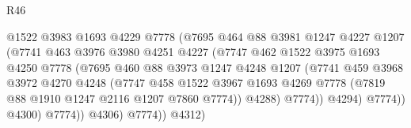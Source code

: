 \begin{lexlean}{R46}
\begin{coremodule}
                                    @1522
                                    @3983
                                    @1693
                                    @4229
                                    @7778
                                    (@7695
                                      @464
                                      @88
                                      @3981
                                      @1247
                                      @4227
                                      @1207
                                      (@7741
                                        @463
                                        @3976
                                        @3980
                                        @4251
                                        @4227
                                        (@7747
                                          @462
                                          @1522
                                          @3975
                                          @1693
                                          @4250
                                          @7778
                                          (@7695
                                            @460
                                            @88
                                            @3973
                                            @1247
                                            @4248
                                            @1207
                                            (@7741
                                              @459
                                              @3968
                                              @3972
                                              @4270
                                              @4248
                                              (@7747
                                                @458
                                                @1522
                                                @3967
                                                @1693
                                                @4269
                                                @7778
                                                (@7819 @88 @1910 @1247 @2116 @1207 @7860 @7774))
                                              @4288)
                                            @7774))
                                        @4294)
                                      @7774))
                                  @4300)
                                @7774))
                            @4306)
                          @7774))
                      @4312)

\end{coremodule}
\end{lexlean}

